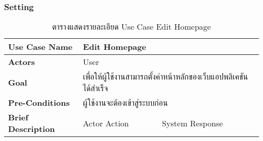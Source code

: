 \documentclass[12pt,oneside,openright,a4paper]{cpe-thai-project}
\begin{document}
\subsubsection{Setting}
\begin{table}[!h]
\caption{ตารางแสดงรายละเอียด Use Case Edit Homepage}\label{tbl:table3.12}
\begin{tabular}{|l|ll|}
\hline
\textbf{Use Case Name}     & \multicolumn{2}{l|}{Edit Homepage}                                                                                                                                                                                                                                                                                                                                                                                                           \\ \hline
\textbf{Actors}            & \multicolumn{2}{l|}{User}                                                                                                                                                                                                                                                                                                                                                                                                                    \\ \hline
\textbf{Goal}              & \multicolumn{2}{l|}{เพื่อให้ผู้ใช้งานสามารถตั้งค่าหน้าหลักของเว็บแอปพลิเคชันได้สำเร็จ}                                                                                                                                                                                                                                                                                                                                                       \\ \hline
\textbf{Pre-Conditions}    & \multicolumn{2}{l|}{ผู้ใช้งานจะต้องเข้าสู่ระบบก่อน}                                                                                                                                                                                                                                                                                                                                                                                          \\ \hline
\textbf{Brief Description} & \multicolumn{1}{l|}{Actor Action}                                                                                                                                                                                                                         & System Response                                                                                                                                                                  \\ \hline

\end{tabular}
\end{table}
\end{document}
